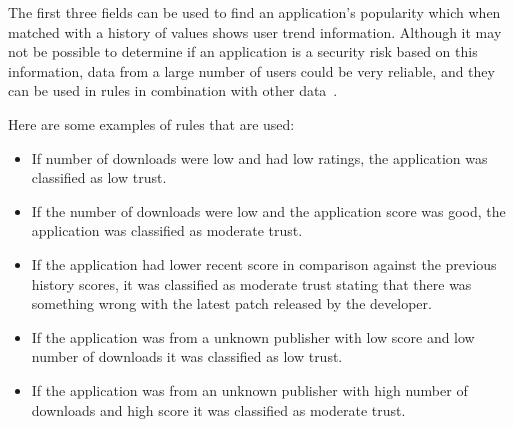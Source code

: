 The first three fields can be used to find an application’s
popularity which when matched with a history of values shows
user trend information.  Although it may not be possible to determine if an
application is a security risk based on this
information, data from a large number of users could be very reliable, and 
they can be used in rules in combination with other data~\cite{jing2014riskmon}.

Here are some examples of rules that are used: 
\begin{itemize}
  \item If number of downloads were low and had low ratings, the
    application was classified as low trust.
  \item If the number of downloads were low and the application
    score was good, the application was classified as moderate trust.
  \item If the application had lower recent score in comparison 
  against the previous history scores, it was classified as moderate 
  trust stating that there was something wrong with the latest patch 
  released by the developer. 
  \item If the application was from a unknown publisher with low score
    and low number of downloads it was classified as low trust.
  \item If the application was from an unknown publisher with high
    number of downloads and high score it was classified as moderate trust.
\end{itemize}
